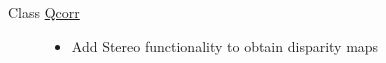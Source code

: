 \label{todo__todo000001}
\hypertarget{todo__todo000001}{}
 \begin{description}
\item[Class \hyperlink{classQcorr}{Qcorr} ]\begin{itemize}
\item Add Stereo functionality to obtain disparity maps\end{itemize}


\end{description}
